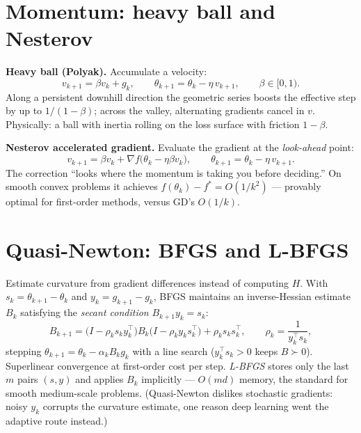 \documentclass[11pt]{article}
\begin{document}
\section{Momentum: heavy ball and Nesterov}

\textbf{Heavy ball (Polyak).} Accumulate a velocity:
\begin{equation}
  v_{k+1} = \beta v_k + g_k,
  \qquad
  \theta_{k+1} = \theta_k - \eta\, v_{k+1},
  \qquad \beta \in [0,1).
  \label{eq:hb}
\end{equation}
Along a persistent downhill direction the geometric series boosts the
effective step by up to $1/(1-\beta)$; across the valley, alternating
gradients cancel in $v$. Physically: a ball with inertia rolling on the
loss surface with friction $1-\beta$.

\textbf{Nesterov accelerated gradient.} Evaluate the gradient at the
\emph{look-ahead} point:
\begin{equation}
  v_{k+1} = \beta v_k + \nabla f\bigl(\theta_k - \eta\beta v_k\bigr),
  \qquad
  \theta_{k+1} = \theta_k - \eta\, v_{k+1}.
  \label{eq:nesterov}
\end{equation}
The correction ``looks where the momentum is taking you before deciding.''
On smooth convex problems it achieves $f(\theta_k)-f^\ast = O(1/k^2)$ —
provably optimal for first-order methods, versus GD's $O(1/k)$.

\section{Quasi-Newton: BFGS and L-BFGS}

Estimate curvature from gradient differences instead of computing $H$.
With $s_k = \theta_{k+1}-\theta_k$ and $y_k = g_{k+1}-g_k$, BFGS maintains
an inverse-Hessian estimate $B_k$ satisfying the \emph{secant condition}
$B_{k+1} y_k = s_k$:
\begin{equation}
  B_{k+1} = \bigl(I - \rho_k s_k y_k^\top\bigr) B_k
            \bigl(I - \rho_k y_k s_k^\top\bigr)
            + \rho_k s_k s_k^\top,
  \qquad \rho_k = \frac{1}{y_k^\top s_k},
  \label{eq:bfgs}
\end{equation}
stepping $\theta_{k+1} = \theta_k - \alpha_k B_k g_k$ with a line search
($y_k^\top s_k > 0$ keeps $B \succ 0$). Superlinear convergence at
first-order cost per step. \emph{L-BFGS} stores only the last $m$ pairs
$(s,y)$ and applies $B_k$ implicitly — $O(md)$ memory, the standard for
smooth medium-scale problems. (Quasi-Newton dislikes stochastic gradients:
noisy $y_k$ corrupts the curvature estimate, one reason deep learning went
the adaptive route instead.)
\end{document}
